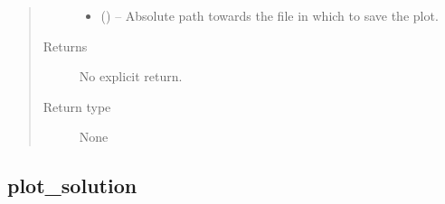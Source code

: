 \documentclass[a4paper,10pt,english]{sphinxmanual}
\begin{document}
\begin{fulllineitems}
\begin{quote}
\begin{description}
\begin{itemize}
\item {} 
 () -- Absolute path towards the file in which to save the plot.

\end{itemize}

\item[{Returns}] \leavevmode
No explicit return.

\item[{Return type}] \leavevmode
None

\end{description}\end{quote}

\end{fulllineitems}



\subsection{plot\_solution}
\label{\detokenize{api/ucf.plot_solution:plot-solution}}\label{\detokenize{api/ucf.plot_solution::doc}}
\end{document}
